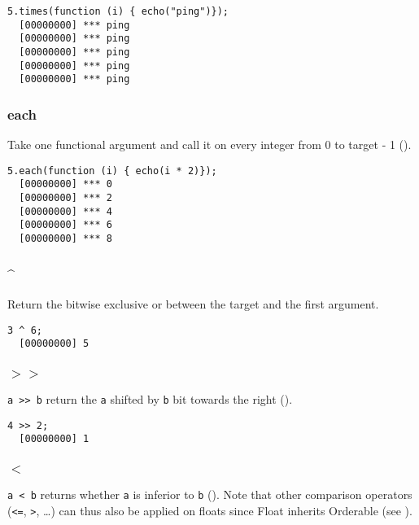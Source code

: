 \begin{lstlisting}[caption=Float.times, label=lst:float-times,
  float=\floatposh]
  5.times(function (i) { echo("ping")});
  [00000000] *** ping
  [00000000] *** ping
  [00000000] *** ping
  [00000000] *** ping
  [00000000] *** ping
\end{lstlisting}

\subsubsection{each}

Take one functional argument and call it on every integer from 0 to
target - 1 ().

\begin{lstlisting}[caption=Float.each, label=lst:float-each,
  float=\floatposh]
  5.each(function (i) { echo(i * 2)});
  [00000000] *** 0
  [00000000] *** 2
  [00000000] *** 4
  [00000000] *** 6
  [00000000] *** 8
\end{lstlisting}

\subsubsection{\^{}}

Return the bitwise exclusive or between the target and the first argument.

\begin{lstlisting}[caption=Float.'\^{}', label=lst:float-bitxor,
  float=\floatposh]
  3 ^ 6;
  [00000000] 5
\end{lstlisting}

\subsubsection{$>>$}

\lstinline|a >> b| return the \lstinline|a| shifted by \lstinline|b|
bit towards the right ().

\begin{lstlisting}[caption=Float.'$>>$', label=lst:float-rshift,
  float=\floatposh]
  4 >> 2;
  [00000000] 1
\end{lstlisting}

\subsubsection{$<$}

\lstinline|a < b| returns whether \lstinline|a| is inferior to
\lstinline|b| (). Note that other comparison operators
(\lstinline|<=|, \lstinline|>|, \ldots) can thus also be applied on
floats since Float inherits Orderable (see ).

